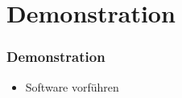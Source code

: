 \section{Demonstration}
\begin{frame}
\frametitle{Demonstration}
\begin{block}{\vspace*{-3ex}}
	\begin{itemize}
	  \item Software vorführen
	\end{itemize}
\end{block}
\end{frame}
